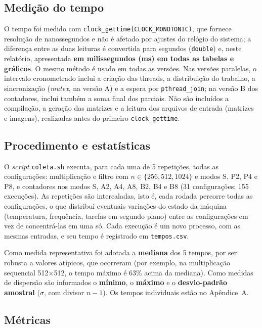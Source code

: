 \documentclass[12pt,a4paper]{article}
\newcommand{\tx}{$\times$}
\begin{document}
\subsection{Medição do tempo}

O tempo foi medido com \texttt{clock\_gettime(CLOCK\_MONOTONIC)}, que fornece resolução de nanossegundos e não é afetado por ajustes do relógio do sistema; a diferença entre as duas leituras é convertida para segundos (\texttt{double}) e, neste relatório, apresentada \textbf{em milissegundos (ms) em todas as tabelas e gráficos}. O mesmo método é usado em todas as versões. Nas versões paralelas, o intervalo cronometrado inclui a criação das threads, a distribuição do trabalho, a sincronização (\emph{mutex}, na versão A) e a espera por \texttt{pthread\_join}; na versão B dos contadores, inclui também a soma final dos parciais. Não são incluídos a compilação, a geração das matrizes e a leitura dos arquivos de entrada (matrizes e imagens), realizadas antes do primeiro \texttt{clock\_gettime}.

\subsection{Procedimento e estatísticas}

O \emph{script} \texttt{coleta.sh} executa, para cada uma de 5 repetições, todas as configurações: multiplicação e filtro com $n\in\{256,512,1024\}$ e modos S, P2, P4 e P8, e contadores nos modos S, A2, A4, A8, B2, B4 e B8 (31 configurações; 155 execuções). As repetições são intercaladas, isto é, cada rodada percorre todas as configurações, o que distribui eventuais variações do estado da máquina (temperatura, frequência, tarefas em segundo plano) entre as configurações em vez de concentrá-las em uma só. Cada execução é um novo processo, com as mesmas entradas, e seu tempo é registrado em \texttt{tempos.csv}.

Como medida representativa foi adotada a \textbf{mediana} dos 5 tempos, por ser robusta a valores atípicos, que ocorreram (por exemplo, na multiplicação sequencial 512\tx512, o tempo máximo é 63\% acima da mediana). Como medidas de dispersão são informados o \textbf{mínimo}, o \textbf{máximo} e o \textbf{desvio-padrão amostral} ($\sigma$, com divisor $n-1$). Os tempos individuais estão no Apêndice~A.

\subsection{Métricas}
\end{document}
